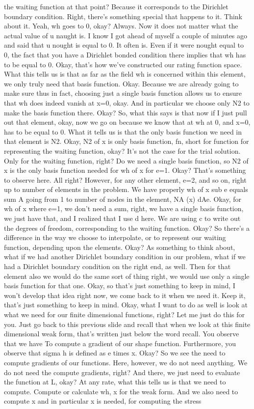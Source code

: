 \documentclass[10pt]{article}
\begin{document}
the waiting function at that point? Because it corresponds to the Dirichlet boundary condition. Right, there's something special that happens to it. Think about it. Yeah, wh goes to 0, okay? Always. Now it does not matter what the actual value of u naught is. I know I got ahead of myself a couple of minutes ago and said that u nought is equal to 0. It often is. Even if it were nought equal to 0, the fact that you have a Dirichlet bonded condition there implies that wh has to be equal to 0. Okay, that's how we've constructed our rating function space. What this tells us is that as far as the field wh is concerned within this element, we only truly need that basis function. Okay. Because we are already going to make sure thus in fact, choosing just a single basis function allows us to ensure that wh does indeed vanish at x=0, okay. And in particular we choose only N2 to make the basis function there. Okay? So, what this says is that now if I just pull out that element, okay, now we go on because we know that at wh at 0, and x=0, has to be equal to 0. What it tells us is that the only basis function we need in that element is N2. Okay, N2 of x is only basis function, fn, short for function for representing the waiting function, okay? It's not the case for the trial solution. Only for the waiting function, right? Do we need a single basis function, so N2 of x is the only basis function needed for wh of x for e=1. Okay? That's something to observe here. All right? However, for any other element, e=2, and so on, right up to number of elements in the problem. We have properly wh of x sub e equals sum A going from 1 to number of nodes in the element, NA (x) dAe. Okay, for wh of x where e=1, we don't need a sum, right, we have a single basis function, we just have that, and I realized that I use d here. We are using c to write out the degrees of freedom, corresponding to the waiting function. Okay? So there's a difference in the way we choose to interpolate, or to represent our waiting function, depending upon the elements. Okay? As something to think about, what if we had another Dirichlet boundary condition in our problem, what if we had a Dirichlet boundary condition on the right end, as well. Then for that element also we would do the same sort of thing right, we would use only a single basis function for that one. Okay, so that's just something to keep in mind, I won't develop that idea right now, we come back to it when we need it. Keep it, that's just something to keep in mind. Okay, what I want to do as well is look at what we need for our finite dimensional functions, right? Let me just do this for you. Just go back to this previous slide and recall that when we look at this finite dimensional weak form, that's written just below the word recall. You observe that we have To compute a gradient of our shape function. Furthermore, you observe that sigma h is defined as e times x. Okay? So we see the need to compute gradients of our functions. Here, however, we do not need anything. We do not need the compute gradients, right? And there, we just need to evaluate the function at L, okay? At any rate, what this tells us is that we need to compute. Compute or calculate wh, x for the weak form. And we also need to compute x and in particular x is needed, for computing the stress 
\end{document}
